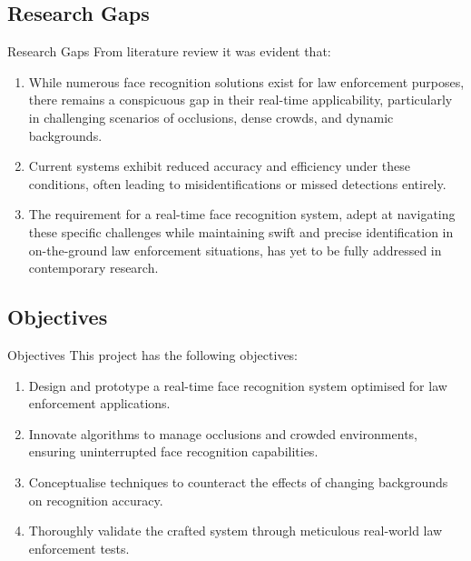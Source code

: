 \subsection{Research Gaps}
\begin{frame}{Research Gaps}
	From literature review it was evident that:
	\begin{enumerate}
		\item While numerous face recognition solutions exist for law enforcement purposes, there remains a conspicuous gap in their real-time applicability, particularly in challenging scenarios of occlusions, dense crowds, and dynamic backgrounds. 

		\item Current systems exhibit reduced accuracy and efficiency under these conditions, often leading to misidentifications or missed detections entirely. 
		
		\item The requirement for a real-time face recognition system, adept at navigating these specific challenges while maintaining swift and precise identification in on-the-ground law enforcement situations, has yet to be fully addressed in contemporary research.
		
	\end{enumerate}
\end{frame}

\subsection{Objectives}
\begin{frame}{Objectives}
	This project has the following objectives:
	\begin{enumerate}
		\item Design and prototype a real-time face recognition system optimised for law enforcement applications.
		\item Innovate algorithms to manage occlusions and crowded environments, ensuring uninterrupted face recognition capabilities.
		\item Conceptualise techniques to counteract the effects of changing backgrounds on recognition accuracy.
		\item Thoroughly validate the crafted system through meticulous real-world law enforcement tests.
	\end{enumerate}
\end{frame}